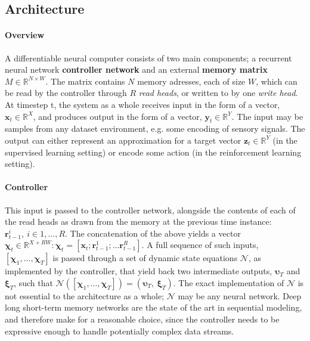 \documentclass[]{article}
\begin{document}
\subsection{Architecture}
\paragraph{Overview} 
A differentiable neural computer consists of two main components; a recurrent neural network \textbf{controller network} and an external \textbf{memory matrix} $M \in \mathbb{R}^{N\times W}$. The matrix contains $N$ memory adresses, each of size $W$, which can be read by the controller through $R$ \textit{read heads}, or written to by one \textit{write head}. At timestep t, the system as a whole receives input in the form of a vector, $\pmb{x}_t \in \mathbb{R}^X$, and produces output in the form of a vector, $\pmb{y}_t \in \mathbb{R}^Y$. The input may be samples from any dataset environment, e.g. some encoding of sensory signals. The output can either represent an approximation for a target vector $\pmb{z}_t \in \mathbb{R}^Y$ (in the supervised learning setting) or encode some action (in the reinforcement learning setting).
\paragraph{Controller}
This input is passed to the controller network, alongside the contents of each of the read heads as drawn from the memory at the previous time instance: $\pmb{r}_{t-1}^{i},\ i \in 1, \dots ,R$. The concatenation of the above yields a vector $\pmb{\chi}_t \in \mathbb{R}^{X + RW}: \pmb{\chi}_t = [\pmb{x}_t; \pmb{r}_{t-1}^1; \dots \pmb{r}_{t-1}^R ] $. A full sequence of such inputs, $[\pmb{\chi}_1,\dots ,\pmb{\chi}_T]$ is passed through a set of dynamic state equations $\mathcal{N}$, as implemented by the controller, that yield back two intermediate outputs, $\pmb{\upsilon }_T$ and $\pmb{\xi}_T$, such that $\mathcal{N}([\pmb{\chi}_1,\dots,\pmb{\chi}_T]) = (\pmb{\upsilon}_T,\ \pmb{\xi}_T)$. The exact implementation of $\mathcal{N}$ is not essential to the architecture as a whole; $\mathcal{N}$ may be any neural network. Deep long short-term memory networks are the state of the art in sequential modeling, and therefore make for a reasonable choice, since the controller needs to be expressive enough to handle potentially complex data streams.
\end{document}
